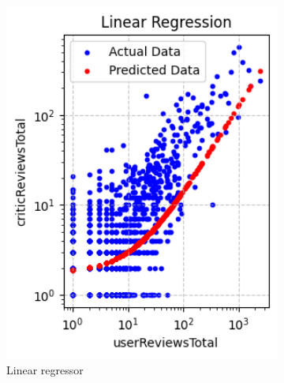 \begin{figure}[H]
    \centering
    \begin{subfigure}{0.2565\textwidth}
        \centering
        \includegraphics[width=1\textwidth]{plots/linear.png}
        \caption{Linear regressor}
        \captionsetup{width=0.9\linewidth, justification=centering}
        \label{fig:linear}
    \end{subfigure}
    \begin{subfigure}{0.24\textwidth}
        \centering

\end{subfigure}
\end{figure}
